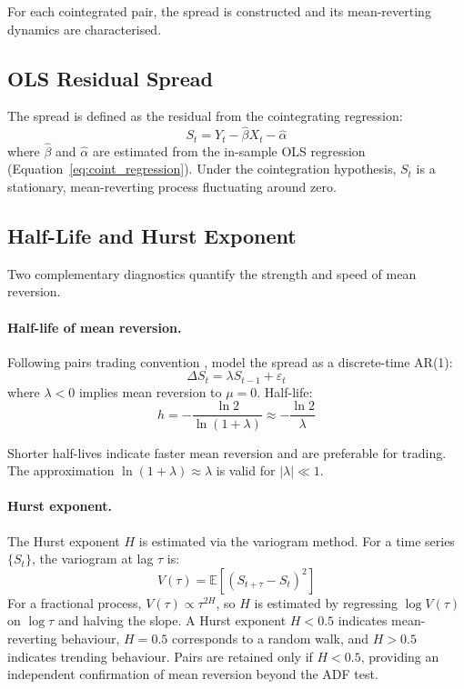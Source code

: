\documentclass[a4paper]{report}
\begin{document}
For each cointegrated pair, the spread is constructed and its mean-reverting dynamics are characterised.

\subsection{OLS Residual Spread}

The spread is defined as the residual from the cointegrating regression:
\begin{equation}
S_t = Y_t - \hat{\beta} X_t - \hat{\alpha}
\label{eq:spread}
\end{equation}
where $\hat{\beta}$ and $\hat{\alpha}$ are estimated from the in-sample OLS regression (Equation~\ref{eq:coint_regression}). Under the cointegration hypothesis, $S_t$ is a stationary, mean-reverting process fluctuating around zero.

\subsection{Half-Life and Hurst Exponent}

Two complementary diagnostics quantify the strength and speed of mean reversion.

\paragraph{Half-life of mean reversion.} Following pairs trading convention \cite{gatev2006}, model the spread as a discrete-time AR(1):
\begin{equation}
\Delta S_t = \lambda S_{t-1} + \varepsilon_t \label{eq:ar1}
\end{equation}
where $\lambda < 0$ implies mean reversion to $\mu = 0$. Half-life:
\begin{equation}
h = -\frac{\ln 2}{\ln(1 + \lambda)} \approx -\frac{\ln 2}{\lambda} \label{eq:halflife}
\end{equation}

Shorter half-lives indicate faster mean reversion and are preferable for trading. The approximation $\ln(1+\lambda) \approx \lambda$ is valid for $|\lambda| \ll 1$.

\paragraph{Hurst exponent.} The Hurst exponent $H$ is estimated via the variogram method. For a time series $\{S_t\}$, the variogram at lag $\tau$ is:
\begin{equation}
V(\tau) = \mathbb{E}\left[(S_{t+\tau} - S_t)^2\right]
\label{eq:variogram}
\end{equation}
For a fractional process, $V(\tau) \propto \tau^{2H}$, so $H$ is estimated by regressing $\log V(\tau)$ on $\log \tau$ and halving the slope. A Hurst exponent $H < 0.5$ indicates mean-reverting behaviour, $H = 0.5$ corresponds to a random walk, and $H > 0.5$ indicates trending behaviour. Pairs are retained only if $H < 0.5$, providing an independent confirmation of mean reversion beyond the ADF test.
\end{document}

